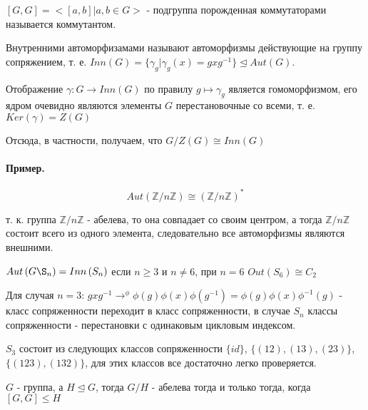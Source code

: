 \begin{Def}
$\left[G, G\right] = <\left[a, b\right] | a,b \in G>$ - подгруппа порожденная коммутаторами называется коммутантом.
\end{Def}

Внутренними автоморфизамами называют автоморфизмы действующие на группу сопряжением, т. е. $Inn\left(G\right) = \lbrace \gamma_g | \gamma_g \left(x\right) = g x g^{-1} \rbrace \trianglelefteq Aut\left(G\right)$.

Отображение $\gamma : G \rightarrow Inn\left(G\right)$ по правилу $g \mapsto \gamma_g$ является гомоморфизмом, его ядром очевидно являются элементы $G$ перестановочные со всеми, т. е. $Ker \left( \gamma \right) = Z\left(G\right)$

Отсюда, в частности, получаем, что $G/Z\left(G\right) \cong Inn\left(G\right)$

\paragraph{Пример.} 
\[
	Aut\left(\mathbb{Z} / {n \mathbb{Z}}\right) \cong \left(\mathbb{Z}/{n \mathbb{Z}}\right)^*
\]

т. к. группа $\mathbb{Z} / {n \mathbb{Z}}$ - абелева, то она совпадает со своим центром, а тогда $\mathbb{Z} / {n \mathbb{Z}}$ состоит всего из одного элемента, следовательно все автоморфизмы являются внешними.

\begin{Th}
$Aut\left(G\S_n\right) = Inn\left(S_n\right)$ если $n \ge 3$ и $n \not= 6$, при $n = 6$ $Out\left(S_6\right) \cong C_2$
\end{Th}

Для случая $n=3$: $g x g^{-1} \rightarrow^{\phi} \phi\left(g\right)\phi\left(x\right)\phi\left(g^{-1}\right) = \phi\left(g\right)\phi\left(x\right)\phi^{-1}\left(g\right)$  - класс сопряженности переходит в класс сопряженности, в случае $S_n$ классы сопряженности - перестановки с одинаковым цикловым индексом.

$S_3$ состоит из следующих классов сопряженности $\lbrace id \rbrace$, $\lbrace \left(1 2\right), \left(1 3\right), \left(2 3\right) \rbrace$, $\lbrace \left(1 2 3\right), \left(1 3 2\right)\rbrace$, для этих классов все достаточно легко проверяется.

\begin{Th}
$G$ - группа, а $H \trianglelefteq G$, тогда $G/H$ - абелева тогда и только тогда, когда $\left[G, G\right] \le H$
\end{Th}

